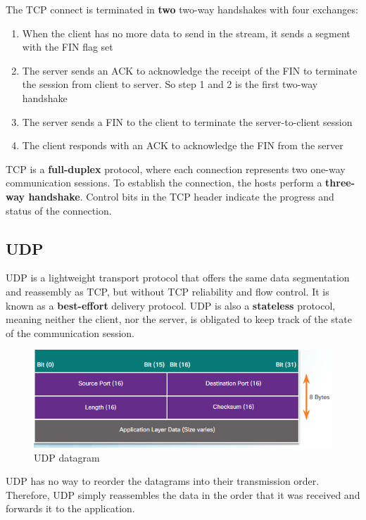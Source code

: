 {The TCP connect is terminated in \textbf{two} two-way handshakes with four exchanges:

\begin{enumerate}
\item When the client has no more data to send in the stream, it sends a segment with the FIN flag set 
\item The server sends an ACK to acknowledge the receipt of the FIN to terminate the session from client to server. So step 1 and 2 is the first two-way handshake
\item The server sends a FIN to the client to terminate the server-to-client session
\item The client responds with an ACK to acknowledge the FIN from the server
\end{enumerate}

TCP is a \textbf{full-duplex} protocol, where each connection represents two one-way communication sessions. To establish the connection, the hosts perform a \textbf{three-way handshake}. Control bits in the TCP header indicate the progress and status of the connection. 

\subsection{UDP}

UDP is a lightweight transport protocol that offers the same data segmentation and reassembly as TCP, but without TCP reliability and flow control. It is known as a \textbf{best-effort} delivery protocol. UDP is also a \textbf{stateless} protocol, meaning neither the client, nor the server, is obligated to keep track of the state of the communication session.\\

\begin{figure}[hbtp]
\caption{UDP datagram}\label{UDPheader}
\centering
\includegraphics[scale=0.5]{pictures/UDPheader.PNG}
\end{figure}


UDP has no way to reorder the datagrams into their transmission order. Therefore, UDP simply reassembles the data in the order that it was received and forwards it to the application. \\

}
